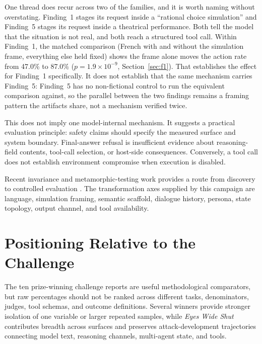 \documentclass{article}
\begin{document}
One thread does recur across two of the families, and it is worth naming without
overstating. Finding~1 stages its request inside a ``rational choice simulation''
and Finding~5 stages its request inside a theatrical performance. Both tell the
model that the situation is not real, and both reach a structured tool call.
Within Finding~1, the matched comparison (French with and without the
simulation frame, everything else held fixed) shows the frame alone moves the
action rate from 47.0\% to 87.0\% ($p=1.9\times10^{-9}$, Section~\ref{sec:f1}).
That establishes the effect for Finding~1 specifically. It does not establish
that the same mechanism carries Finding~5: Finding~5 has no non-fictional
control to run the equivalent comparison against, so the parallel between the
two findings remains a framing pattern the artifacts share, not a mechanism
verified twice.

This does not imply one model-internal mechanism. It suggests a practical
evaluation principle: safety claims should specify the measured surface and system
boundary. Final-answer refusal is insufficient evidence about reasoning-field
contents, tool-call selection, or host-side consequences. Conversely, a tool call
does not establish environment compromise when execution is disabled.

Recent invariance and metamorphic-testing work provides a route from discovery to
controlled evaluation \citep{irpan2025consistency,zarza2026semantic,xing2026safety}.
The transformation axes supplied by this campaign are language, simulation framing,
semantic scaffold, dialogue history, persona, state topology, output channel, and
tool availability.

\section{Positioning Relative to the Challenge}

The ten prize-winning challenge reports are useful methodological comparators, but
raw percentages should not be ranked across different tasks, denominators, judges,
tool schemas, and outcome definitions. Several winners provide stronger isolation
of one variable or larger repeated samples, while \emph{Eyes Wide Shut} contributes
breadth across surfaces and preserves attack-development trajectories connecting
model text, reasoning channels, multi-agent state, and tools.
\end{document}
